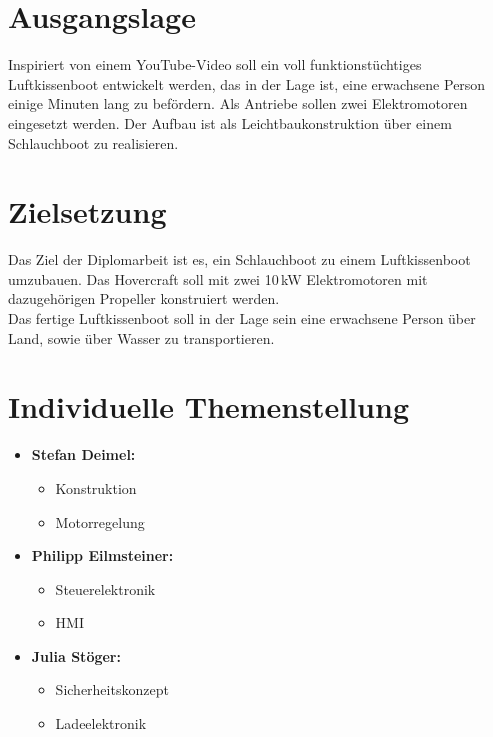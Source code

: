 \section{Ausgangslage}
Inspiriert von einem YouTube-Video\textsuperscript{\cite{YoutubeVideo}} soll ein voll funktionstüchtiges Luftkissenboot entwickelt werden, das in der Lage ist, eine erwachsene Person einige Minuten lang zu befördern. Als Antriebe sollen zwei Elektromotoren eingesetzt werden. Der Aufbau ist als Leichtbaukonstruktion über einem Schlauchboot zu realisieren.

\section{Zielsetzung}
Das Ziel der Diplomarbeit ist es, ein Schlauchboot zu einem Luftkissenboot umzubauen. Das Hovercraft soll mit zwei 10\,kW Elektromotoren mit dazugehörigen Propeller konstruiert werden.\\
Das fertige Luftkissenboot soll in der Lage sein eine erwachsene Person über Land, sowie über Wasser zu transportieren.

\section{Individuelle Themenstellung}
\begin{itemize}
    \item \textbf{Stefan Deimel:}
    \begin{itemize}
      \item Konstruktion
      \item Motorregelung
    \end{itemize}
    \item \textbf{Philipp Eilmsteiner:}
    \begin{itemize}
      \item Steuerelektronik
      \item HMI
    \end{itemize}
    \item \textbf{Julia Stöger:}
    \begin{itemize}
      \item Sicherheitskonzept
      \item Ladeelektronik
    \end{itemize}
\end{itemize}
